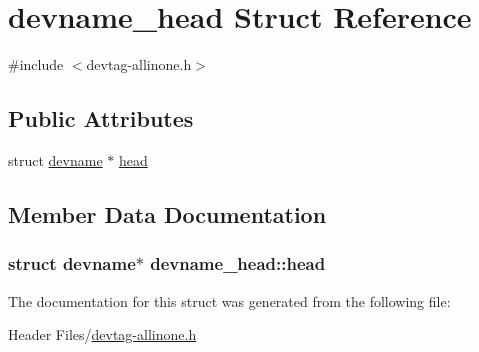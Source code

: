 \hypertarget{structdevname__head}{\section{devname\-\_\-head \-Struct \-Reference}
\label{structdevname__head}
}


{\ttfamily \#include $<$devtag-\/allinone.\-h$>$}

\subsection*{\-Public \-Attributes}
\begin{DoxyCompactItemize}
\item 
struct \hyperlink{structdevname}{devname} $\ast$ \hyperlink{structdevname__head_a8fff74dd1d4459a0512cdb76f8a18fe6}{head}
\end{DoxyCompactItemize}


\subsection{\-Member \-Data \-Documentation}
\hypertarget{structdevname__head_a8fff74dd1d4459a0512cdb76f8a18fe6}{
\subsubsection[{head}]{\setlength{\rightskip}{0pt plus 5cm}struct {\bf devname}$\ast$ {\bf devname\-\_\-head\-::head}}}\label{structdevname__head_a8fff74dd1d4459a0512cdb76f8a18fe6}


\-The documentation for this struct was generated from the following file\-:\begin{DoxyCompactItemize}
\item 
\-Header Files/\hyperlink{devtag-allinone_8h}{devtag-\/allinone.\-h}\end{DoxyCompactItemize}
